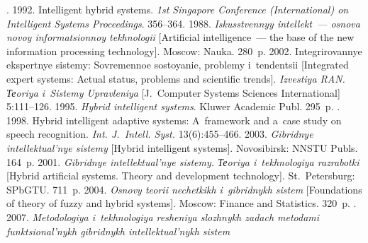 




  \begin{multicols}{2}

\renewcommand{\bibname}{\protect\rmfamily References}

{\small\frenchspacing
 {%
 \begin{thebibliography}{99}
. 1992. Intelligent hybrid systems. 
\textit{1st Singapore  Conference (International) on Intelligent Systems
Proceedings}. 356--364.
 1988. \textit{Iskusstvennyy intellekt~--- osnova novoy informatsionnoy 
tekhnologii} [Artificial intelligence~--- the base of the new information processing technology]. 
Moscow: Nauka. 280~p.
 2002. Integrirovannye ekspertnye sistemy: Sovremennoe sostoyanie, 
problemy i~tendentsii [Integrated expert systems: Actual status, problems and scientific trends]. 
\textit{Izvestiya RAN. Теoriya i~Sistemy Upravleniya} [J.~Computer Systems Sciences 
International] 5:111--126.
 1995. \textit{Hybrid intelligent systems}. Kluwer Academic Publ. 
295~p.
. 1998. Hybrid intelligent adaptive systems: A~framework and 
a~case study on speech recognition. \textit{Int. J.~Intell. Syst.} 13(6):455--466.
 2003. \textit{Gibridnye intellektual'nye sistemy} [Hybrid intelligent 
systems]. Novosibirsk: NNSTU Publs.  164~p.
 2001. \textit{Gibridnye intellektual'nye sistemy. Теoriya i~tekhnologiya 
razrabotki} [Hybrid artificial systems. Theory and development technology]. 
St.\ Petersburg:  \mbox{SPbGTU}. 711~p.
 2004. \textit{Osnovy teorii nechetkikh i~gibridnykh sistem} [Foundations 
of theory of fuzzy and hybrid systems]. Moscow: Finance and Statistics. 320~p.
. 2007. \textit{Metodologiya i~tekhnologiya 
resheniya slozhnykh zadach metodami funk\-tsi\-o\-nal'nykh gibridnykh intellektual'nykh sistem} 

\end{thebibliography}}}
\end{multicols}
